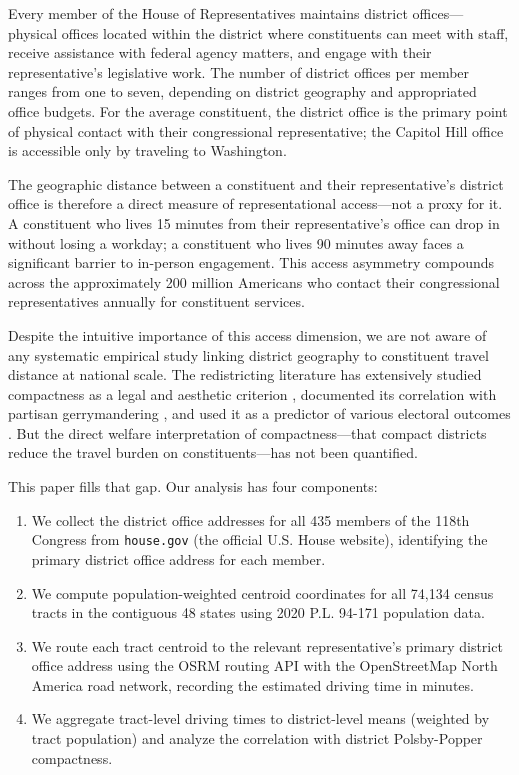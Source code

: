 \label{sec:introduction}

Every member of the House of Representatives maintains district offices---physical
offices located within the district where constituents can meet with staff, receive
assistance with federal agency matters, and engage with their representative's
legislative work. The number of district offices per member ranges from one to seven,
depending on district geography and appropriated office budgets. For the average
constituent, the district office is the primary point of physical contact with
their congressional representative; the Capitol Hill office is accessible only by
traveling to Washington.

The geographic distance between a constituent and their representative's district
office is therefore a direct measure of representational access---not a proxy
for it. A constituent who lives 15 minutes from their representative's office can
drop in without losing a workday; a constituent who lives 90 minutes away faces
a significant barrier to in-person engagement. This access asymmetry compounds
across the approximately 200 million Americans who contact their congressional
representatives annually for constituent services.

Despite the intuitive importance of this access dimension, we are not aware of any
systematic empirical study linking district geography to constituent travel distance
at national scale. The redistricting literature has extensively studied compactness
as a legal and aesthetic criterion \citep{polsby1991,young1988}, documented its
correlation with partisan gerrymandering \citep{chen2013}, and used it as a predictor
of various electoral outcomes \citep{levin2019}. But the direct welfare interpretation
of compactness---that compact districts reduce the travel burden on constituents---has
not been quantified.

This paper fills that gap. Our analysis has four components:

\begin{enumerate}
\item We collect the district office addresses for all 435 members of the 118th Congress
  from \texttt{house.gov} (the official U.S. House website), identifying the primary
  district office address for each member.

\item We compute population-weighted centroid coordinates for all 74,134 census tracts
  in the contiguous 48 states using 2020 P.L. 94-171 population data.

\item We route each tract centroid to the relevant representative's primary district
  office address using the OSRM routing API with the OpenStreetMap North America
  road network, recording the estimated driving time in minutes.

\item We aggregate tract-level driving times to district-level means (weighted by
  tract population) and analyze the correlation with district Polsby-Popper compactness.
\end{enumerate}

